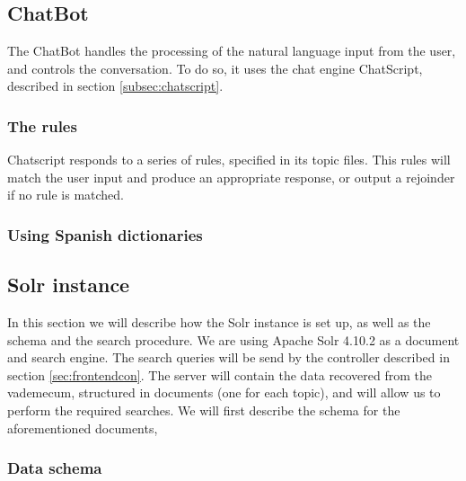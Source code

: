 \subsection{ChatBot}
\label{sec:chatbot}

The ChatBot handles the processing of the natural language input from the user, and controls the conversation. To do so, it uses the chat engine ChatScript, described in section \ref{subsec:chatscript}.

\subsubsection{The rules}

Chatscript responds to a series of rules, specified in its topic files. This rules will match the user input and produce an appropriate response, or output a rejoinder if no rule is matched.

\subsubsection{Using Spanish dictionaries}


\subsection{Solr instance}
\label{sec:solr}

In this section we will describe how the Solr instance is set up, as well as the schema and the search procedure. We are using Apache Solr 4.10.2 as a document and search engine. The search queries will be send by the controller described in section \ref{sec:frontendcon}. The server will contain the data recovered from the vademecum, structured in documents (one for each topic), and will allow us to perform the required searches. We will first describe the schema for the aforementioned documents, 




\subsubsection{Data schema}

